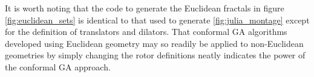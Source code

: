 It is worth noting that the code to generate the Euclidean fractals in figure 
\ref{fig:euclidean_sets} is identical to that used to generate
\ref{fig:julia_montage} except for the 
definition of translators and dilators.
That conformal GA algorithms developed using Euclidean geometry may so readily
be applied to non-Euclidean geometries by simply changing the rotor definitions neatly
indicates the power of the conformal GA approach.



